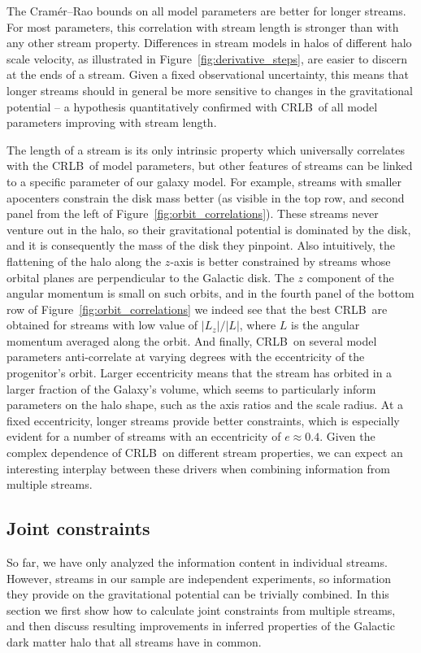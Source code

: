 \documentclass[modern]{aastex61}
\newcommand{\acronym}[1]{{\small{#1}}}
\newcommand{\CRLB}{\acronym{CRLB}}
\begin{document}
The Cram\' er--Rao bounds on all model parameters are better for longer streams.
For most parameters, this correlation with stream length is stronger than with any other stream property.
Differences in stream models in halos of different halo scale velocity, as illustrated in Figure~\ref{fig:derivative_steps}, are easier to discern at the ends of a stream.
Given a fixed observational uncertainty, this means that longer streams should in general be more sensitive to changes in the gravitational potential -- a hypothesis quantitatively confirmed with \CRLB\ of all model parameters improving with stream length.

The length of a stream is its only intrinsic property which universally correlates with the \CRLB\ of model parameters, but other features of streams can be linked to a specific parameter of our galaxy model.
For example, streams with smaller apocenters constrain the disk mass better (as visible in the top row, and second panel from the left of Figure~\ref{fig:orbit_correlations}).
These streams never venture out in the halo, so their gravitational potential is dominated by the disk, and it is consequently the mass of the disk they pinpoint.
Also intuitively, the flattening of the halo along the $z$-axis is better constrained by streams whose orbital planes are perpendicular to the Galactic disk.
The $z$ component of the angular momentum is small on such orbits, and in the fourth panel of the bottom row of Figure~\ref{fig:orbit_correlations} we indeed see that the best \CRLB\ are obtained for streams with low value of $|L_z|/|L|$, where $L$ is the angular momentum averaged along the orbit.
And finally, \CRLB\ on several model parameters anti-correlate at varying degrees with the eccentricity of the progenitor's orbit.
Larger eccentricity means that the stream has orbited in a larger fraction of the Galaxy's volume, which seems to particularly inform parameters on the halo shape, such as the axis ratios and the scale radius.
At a fixed eccentricity, longer streams provide better constraints, which is especially evident for a number of streams with an eccentricity of $e\approx0.4$.
Given the complex dependence of \CRLB\ on different stream properties, we can expect an interesting interplay between these drivers when combining information from multiple streams.

\subsection{Joint constraints}
\label{sec:res_joint}
So far, we have only analyzed the information content in individual streams.
However, streams in our sample are independent experiments, so information they provide on the gravitational potential can be trivially combined.
In this section we first show how to calculate joint constraints from multiple streams, and then discuss resulting improvements in inferred properties of the Galactic dark matter halo that all streams have in common. 
\end{document}
